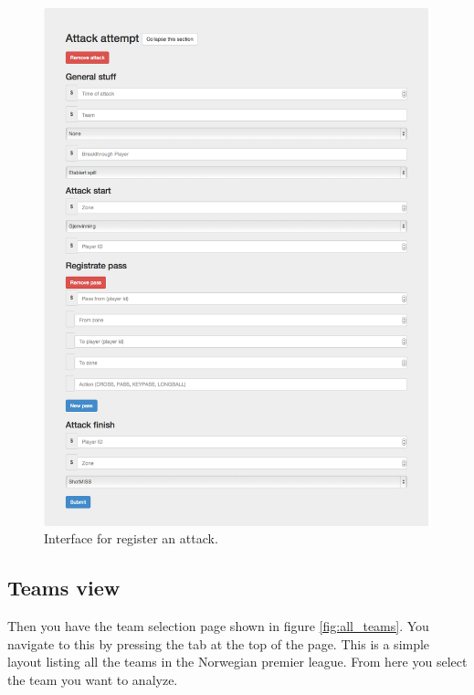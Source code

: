 \begin{figure}[H]
\centering
\includegraphics[width=1\textwidth]{images/general/reg_attack.png}
\caption{Interface for register an attack.}
\label{fig:reg_attack}
\end{figure}

\subsection{Teams view}

Then you have the team selection page shown in figure \ref{fig:all_teams}. You navigate to this by pressing the tab at the top of the page. This is a simple layout listing all the teams in the Norwegian premier league. From here you select the team you want to analyze.


